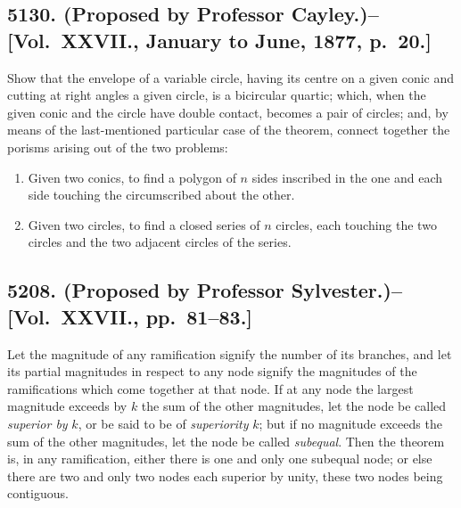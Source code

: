 \documentclass[11pt,a4paper]{article}
\theoremstyle{definition}
\begin{document}
\newpage

\subsection*{5130. (Proposed by Professor Cayley.)\---[Vol.~XXVII., January to June, 1877, p.~20.]}

Show that the envelope of a variable circle, having its centre on a given conic and cutting at right angles a given circle, is a bicircular quartic; which, when the given conic and the circle have double contact, becomes a pair of circles; and, by means of the last-mentioned particular case of the theorem, connect together the porisms arising out of the two problems:
\begin{enumerate}[label=(\roman*)]
\item Given two conics, to find a polygon of $n$ sides inscribed in the one and each side touching the circumscribed about the other.
\item Given two circles, to find a closed series of $n$ circles, each touching the two circles and the two adjacent circles of the series.
\end{enumerate}

\subsection*{5208. (Proposed by Professor Sylvester.)\---[Vol.~XXVII., pp.~81--83.]}

Let the magnitude of any ramification signify the number of its branches, and let its partial magnitudes in respect to any node signify the magnitudes of the ramifications which come together at that node. If at any node the largest magnitude exceeds by $k$ the sum of the other magnitudes, let the node be called \textit{superior by} $k$, or be said to be of \textit{superiority} $k$; but if no magnitude exceeds the sum of the other magnitudes, let the node be called \textit{subequal}. Then the theorem is, in any ramification, either there is one and only one subequal node; or else there are two and only two nodes each superior by unity, these two nodes being contiguous.
\end{document}

